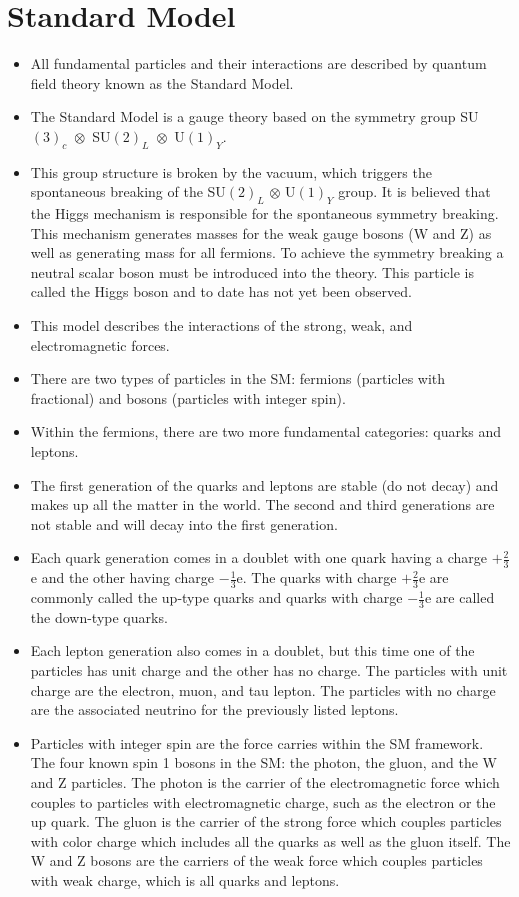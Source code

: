  


\section{Standard Model}
\begin{itemize}
\item All fundamental particles and their interactions are described by quantum field theory known as the Standard Model.
\item The Standard Model is a gauge theory based on the symmetry group \mbox{SU$(3)_{c}$ $\otimes$ SU$(2)_{L}$ $\otimes$ U$(1)_{Y}$}.
\item This group structure is broken by the vacuum, which triggers the spontaneous breaking of the SU$(2)_{L}$ $\otimes$ U$(1)_{Y}$ group. It is believed that the Higgs mechanism is responsible for the spontaneous symmetry breaking. This mechanism generates masses for the weak gauge bosons (W and Z) as well as generating mass for all fermions. To achieve the symmetry breaking a neutral scalar boson must be introduced into the theory. This particle is called the Higgs boson and to date has not yet been observed.
\item This model describes the interactions of the strong, weak, and electromagnetic forces.
\item There are two types of particles in the SM: fermions (particles with fractional) and bosons (particles with integer spin).
\item Within the fermions, there are two more fundamental categories: quarks and leptons.
\item The first generation of the quarks and leptons are stable (do not decay) and makes up all the matter in the world. The second and third generations are not stable and will decay into the first generation.
\item Each quark generation comes in a doublet with one quark having a charge $+\frac{2}{3}$e and the other having charge $-\frac{1}{3}$e. The quarks with charge $+\frac{2}{3}$e are commonly called the up-type quarks and quarks with charge $-\frac{1}{3}$e are called the down-type quarks.
\item Each lepton generation also comes in a doublet, but this time one of the particles has unit charge and the other has no charge. The particles with unit charge are the electron, muon, and tau lepton. The particles with no charge are the associated neutrino for the previously listed leptons.
\item Particles with integer spin are the force carries within the SM framework. The four known spin 1 bosons in the SM: the photon, the gluon, and the W and Z particles. The photon is the carrier of the electromagnetic force which couples to particles with electromagnetic charge, such as the electron or the up quark. The gluon is the carrier of the strong force which couples particles with color charge which includes all the quarks as well as the gluon itself. The W and Z bosons are the carriers of the weak force which couples particles with weak charge, which is all quarks and leptons.

\end{itemize}
